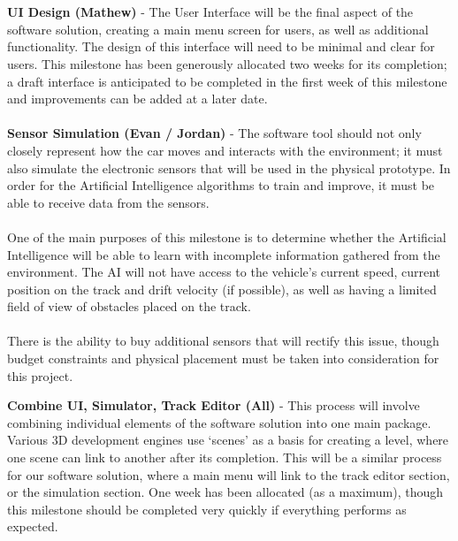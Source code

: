 \documentclass[8pt]{article}
\begin{document}
\\\\
\textbf{UI Design (Mathew)} - The User Interface will be the final aspect of the software solution, creating a main menu screen for users, as well as additional functionality. The design of this interface will need to be minimal and clear for users. This milestone has been generously allocated two weeks for its completion; a draft interface is anticipated to be completed in the first week of this milestone and improvements can be added at a later date.
\\\\
\textbf{Sensor Simulation (Evan / Jordan)} - The software tool should not only closely represent how the car moves and interacts with the environment; it must also simulate the electronic sensors that will be used in the physical prototype. In order for the Artificial Intelligence algorithms to train and improve, it must be able to receive data from the sensors.
\\\\
One of the main purposes of this milestone is to determine whether the Artificial Intelligence will be able to learn with incomplete information gathered from the environment. The AI will not have access to the vehicle’s current speed, current position on the track and drift velocity (if possible), as well as having a limited field of view of obstacles placed on the track.
\\\\
There is the ability to buy additional sensors that will rectify this issue, though budget constraints and physical placement must be taken into consideration for this project.

\newpage

%
%
%


\textbf{Combine UI, Simulator, Track Editor (All)} - This process will involve combining individual elements of the software solution into one main package. Various 3D development engines use ‘scenes’ as a basis for creating a level, where one scene can link to another after its completion. This will be a similar process for our software solution, where a main menu will link to the track editor section, or the simulation section. One week has been allocated (as a maximum), though this milestone should be completed very quickly if everything performs as expected.
\end{document}
